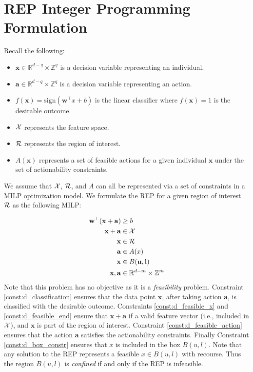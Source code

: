 \section{REP Integer Programming Formulation} \label{app:rep_form}
Recall the following:
\begin{itemize}
    \item $\mathbf{x} \in \mathbb{R}^{d-q} \times \mathbb{Z}^q$ is a decision variable representing an  individual.
    \item $\mathbf{a} \in \mathbb{R}^{d-q} \times \mathbb{Z}^q$ is a decision variable representing an action.
    \item  $f(\mathbf{x}) = \text{sign}(\mathbf{w}^\top x + b)$ is the linear classifier where $f(\mathbf{x}) = 1$ is the desirable outcome.
    \item ${\cal X}$ represents the feature space.
    \item ${\cal R}$ represents the region of interest.
    \item $A(\mathbf{x})$ represents a set of feasible actions for a given individual $\mathbf{x}$ under the set of actionability constraints.
\end{itemize}

We assume that ${\cal X}$, ${\cal R}$, and $A$ can all be represented via a set of constraints in a MILP optimization model. We formulate the REP for a given region of interest ${\cal R}$ as the following MILP:

\begin{subequations}
\begin{align}
	&& \mathbf{w}^\top(\mathbf{x} + \mathbf{a}) &\geq b ~~&& \label{const:d_classification}\\
	&& \mathbf{x} + \mathbf{a} &\in {\cal X} && \label{const:d_feasible_end} \\
	&& \mathbf{x} &\in {\cal R} && \label{const:d_feasible_x} \\
	&& \mathbf{a} &\in A(x) && \label{const:d_feasible_action} \\
	&& \mathbf{x} &\in B(\mathbf{u}, \mathbf{l}) && \label{const:d_box_constr} \\
	&& \mathbf{x}, \mathbf{a} &\in \mathbb{R}^{d-m} \times \mathbb{Z}^m \label{const:d_binary}
\end{align}
\end{subequations}
Note that this problem has no objective as it is a \emph{feasibility} problem. 
Constraint \eqref{const:d_classification} ensures that the data point $\mathbf{x}$, after taking action $\mathbf{a}$, is classified with the desirable outcome. 
Constraints \eqref{const:d_feasible_x} and \eqref{const:d_feasible_end} ensure that $\mathbf{x}+\mathbf{a}$ if a valid feature vector (i.e., included in ${\cal X}$), and $\mathbf{x}$ is part of the region of interest. 
Constraint \eqref{const:d_feasible_action} ensures that the action $\mathbf{a}$ satisfies the actionability constraints. Finally Constraint \eqref{const:d_box_constr} ensures that $x$ is included in the box $B(u, l)$. Note that any solution to the REP represents a feasible $x \in B(u, l)$ with recourse. Thus the region $B(u,l)$ is \emph{confined} if and only if the REP is infeasible. 

